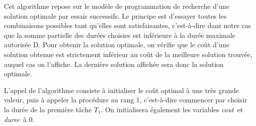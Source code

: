 \documentclass[a4paper, titlepage]{article}
\begin{document}
			Cet algorithme repose sur le modèle de programmation de recherche d'une solution optimale par essais successifs.
			Le principe est d'essayer toutes les combinaisons possibles tant qu'elles sont satisfaisantes, c'est-à-dire dans notre cas que la somme partielle des durées choisies est inférieure à la durée maximale autorisée D.
			Pour obtenir la solution optimale, on vérifie que le coût d'une solution obtenue est strictement inférieur au coût de la meilleure solution trouvée, auquel cas on l'affiche.
			La dernière solution affichée sera donc la solution optimale.

			L'appel de l'algorithme consiste à initialiser le coût optimal à une très grande valeur, puis à appeler la procédure au rang 1, c'est-à-dire commencer par choisir la durée de la première tâche $T_{1}$.
			On initialisera également les variables \emph{cout} et \emph{duree} à 0.
\end{document}
